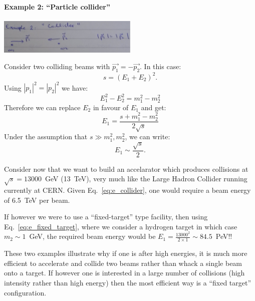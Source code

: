 \paragraph{Example 2: ``Particle collider''}
\begin{center}
\includegraphics[width=0.5\textwidth]{fig/collisions/collisions_example2.jpg}
\end{center}
Consider two colliding beams with $\vec{p_1}=-\vec{p_2}$.
In this case:
\[
s=(E_{1}+E_{2})^{2}.
\]
Using  $|p_1|^2=|p_2|^2$ we have:
\[
E_{1}^{2}-E_{2}^{2}=m_{1}^{2}-m_{2}^{2}
\]
Therefore we can replace $E_2$ in favour of $E_1$ and get:
\[
E_1=\frac{s+m_{1}^{2}-m_{2}^{2}}{2\sqrt{s}}
\]
Under the assumption that $s \gg m_{1}^2,m_{2}^2$, we can write:
\begin{equation}
\label{eq:e_collider}
E_{1}\sim \frac{\sqrt{s}}{2}.
\end{equation}

Consider now that we want to build an accelarator which produces collisions
at $\sqrt{s}=13$000~GeV (13~TeV), very much like the Large Hadron Collider running
currently at CERN. Given Eq.~\ref{eq:e_collider}, one would require a beam energy of 6.5~TeV per beam. 

If however we were to use a ``fixed-target'' type facility, then using Eq.~\ref{eq:e_fixed_target}, where we consider a hydrogen target in which case $m_{2}\sim 1$~GeV, the required beam energy would be $E_{1}=\frac{13000^2}{2\times1}\sim84.5$~PeV!!

These two examples illustrate why if one is after high energies, it is much more efficient to accelerate and collide two beams rather than whack a single beam onto a target. If however one is interested in a large number of collisions (high intensity rather than high energy) then the most efficient way is a ``fixed target'' configuration.


